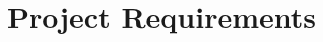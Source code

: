 
\section{Project Requirements}

\renewcommand{\labelenumi}{\theenumi}
\renewcommand{\labelenumii}{\theenumii}
\renewcommand{\labelenumiii}{\theenumiii}
\renewcommand{\labelenumiv}{\theenumiv}
\renewcommand{\theenumi}{\textbf{FR.\arabic{enumi}}}
\renewcommand{\theenumii}{\textbf{DR.\arabic{enumi}.\arabic{enumii}}}
\renewcommand{\theenumiii}{\textbf{DR.\arabic{enumi}.\arabic{enumii}.\arabic{enumiii}}}
\renewcommand{\theenumiv}{\textbf{DR.\arabic{enumi}.\arabic{enumii}.\arabic{enumiii}.\arabic{enumiv}}}

